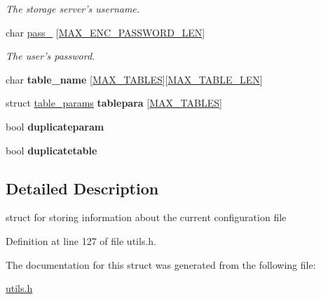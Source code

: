 \begin{DoxyCompactItemize}
\begin{DoxyCompactList}\small\item\em The storage server's username. \end{DoxyCompactList}\item 
\hypertarget{structconfig__params_a35afa7087dd6f3a39086d4496c0d1589}{char \hyperlink{structconfig__params_a35afa7087dd6f3a39086d4496c0d1589}{pass\-\_\-} \mbox{[}\hyperlink{storage_8h_aa13f93b74a500b0fd36cf2fd2fa5f30b}{M\-A\-X\-\_\-\-E\-N\-C\-\_\-\-P\-A\-S\-S\-W\-O\-R\-D\-\_\-\-L\-E\-N}\mbox{]}}\label{structconfig__params_a35afa7087dd6f3a39086d4496c0d1589}

\begin{DoxyCompactList}\small\item\em The user's password. \end{DoxyCompactList}\item 
\hypertarget{structconfig__params_abfdb0181a3b9bd68019b4241763410f9}{char {\bfseries table\-\_\-name} \mbox{[}\hyperlink{storage_8h_a6f4cdd0162e9f2ab251fa5b23410c8da}{M\-A\-X\-\_\-\-T\-A\-B\-L\-E\-S}\mbox{]}\mbox{[}\hyperlink{storage_8h_ae7854bc280576d57ec5c80995d5ea94c}{M\-A\-X\-\_\-\-T\-A\-B\-L\-E\-\_\-\-L\-E\-N}\mbox{]}}\label{structconfig__params_abfdb0181a3b9bd68019b4241763410f9}

\item 
\hypertarget{structconfig__params_a513c454486e302d2459152ea6ea2be6a}{struct \hyperlink{structtable__params}{table\-\_\-params} {\bfseries tablepara} \mbox{[}\hyperlink{storage_8h_a6f4cdd0162e9f2ab251fa5b23410c8da}{M\-A\-X\-\_\-\-T\-A\-B\-L\-E\-S}\mbox{]}}\label{structconfig__params_a513c454486e302d2459152ea6ea2be6a}

\item 
\hypertarget{structconfig__params_a7482c06fecd795035fa7312af9b06a6b}{bool {\bfseries duplicateparam}}\label{structconfig__params_a7482c06fecd795035fa7312af9b06a6b}

\item 
\hypertarget{structconfig__params_a07f293e0820242cc8e4526384bb181d6}{bool {\bfseries duplicatetable}}\label{structconfig__params_a07f293e0820242cc8e4526384bb181d6}

\end{DoxyCompactItemize}


\subsection{Detailed Description}
struct for storing information about the current configuration file 

Definition at line 127 of file utils.\-h.



The documentation for this struct was generated from the following file\-:\begin{DoxyCompactItemize}
\item 
\hyperlink{utils_8h}{utils.\-h}\end{DoxyCompactItemize}
